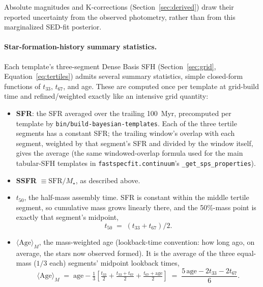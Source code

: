 \documentclass[12pt]{article}
\begin{document}
Absolute magnitudes and K-corrections (Section~\ref{sec:derived}) draw
their reported uncertainty from the observed photometry, rather than from
this marginalized SED-fit posterior.

\paragraph{Star-formation-history summary statistics.}
\label{sec:sfhstats}
Each template's three-segment Dense Basis SFH (Section~\ref{sec:grid},
Equation~\ref{eq:tertiles}) admits several summary statistics, simple
closed-form functions of $t_{33}$, $t_{67}$, and age. These are computed
once per template at grid-build time and refined/weighted exactly like an
intensive grid quantity:
\begin{itemize}
\item \textbf{SFR}: the SFR averaged over the trailing 100~Myr,
  precomputed per template by \texttt{bin/build-bayesian-templates}. Each
  of the three tertile segments has a constant SFR; the trailing window's
  overlap with each segment, weighted by that segment's SFR and divided
  by the window itself, gives the average (the same windowed-overlap
  formula used for the main tabular-SFH templates in
  \texttt{fastspecfit.continuum}'s \texttt{\_get\_sps\_properties}).
\item \textbf{SSFR} $\equiv \mathrm{SFR}/M_\star$, as described above.
\item \textbf{$t_{50}$}, the half-mass assembly time. SFR is constant
  within the middle tertile segment, so cumulative mass grows linearly
  there, and the 50\%-mass point is exactly that segment's midpoint,
  \begin{equation}
    t_{50} \;=\; (t_{33} + t_{67})/2.
    \label{eq:t50}
  \end{equation}
\item \textbf{$\langle\mathrm{Age}\rangle_M$}, the mass-weighted age
  (lookback-time convention: how long ago, on average, the stars now
  observed formed). It is the average of the three equal-mass ($1/3$
  each) segments' midpoint lookback times,
  \begin{equation}
    \langle\mathrm{Age}\rangle_M \;=\; \mathrm{age} - \tfrac{1}{3}
    \left[\tfrac{t_{33}}{2} + \tfrac{t_{33}+t_{67}}{2} +
    \tfrac{t_{67}+\mathrm{age}}{2}\right]
    \;=\; \frac{5\,\mathrm{age} - 2t_{33} - 2t_{67}}{6}.
    \label{eq:mstarage}
  \end{equation}
\end{itemize}
\end{document}
